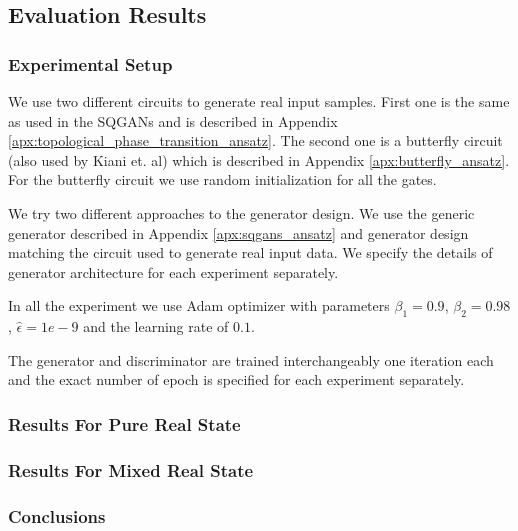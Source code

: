 \subsection{Evaluation Results}
\subsubsection{Experimental Setup}
We use two different circuits to generate real input samples. First one is the
same as used in the SQGANs and is described in Appendix
\ref{apx:topological_phase_transition_ansatz}.
The second one is a butterfly circuit (also used by Kiani et.
al\cite{kiani2021quantum}) which is described in Appendix
\ref{apx:butterfly_ansatz}. For the butterfly circuit we use random
initialization for all the gates.

We try two different approaches to the generator design. We use the generic
generator described in Appendix \ref{apx:sqgans_ansatz} and generator
design matching the circuit used to generate real input data. We specify the
details of generator architecture for each experiment separately.

In all the experiment we use Adam optimizer \cite{kingma2017adam} with
parameters $\beta_1 = 0.9$, $\beta_2=0.98$, $\hat{\epsilon} = 1e-9$ and the
learning rate of $0.1$.

The generator and discriminator are trained interchangeably one iteration each
and the exact number of epoch is specified for each experiment separately.
\subsubsection{Results For Pure Real State}
\subsubsection{Results For Mixed Real State}
\subsubsection{Conclusions}


